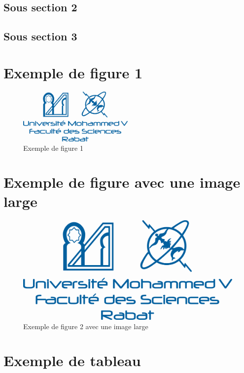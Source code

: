             \subsection{Sous section 2}
            \subsection{Sous section 3}
\newpage
        \section{Exemple de figure 1}
        \begin{figure}[h]
        \centering
        \includegraphics[width=0.5\textwidth]{./images/fsr_invisible.png}
        \caption{Exemple de figure 1}
        \end{figure}

        \section{Exemple de figure  avec une image large}
        \begin{figure}[h]
            \centering
            \includegraphics[width=1\textwidth]{./images/fsr_invisible.png}
            \caption{Exemple de figure 2 avec une image large} 
            \end{figure}
\newpage
\section{Exemple de tableau}
